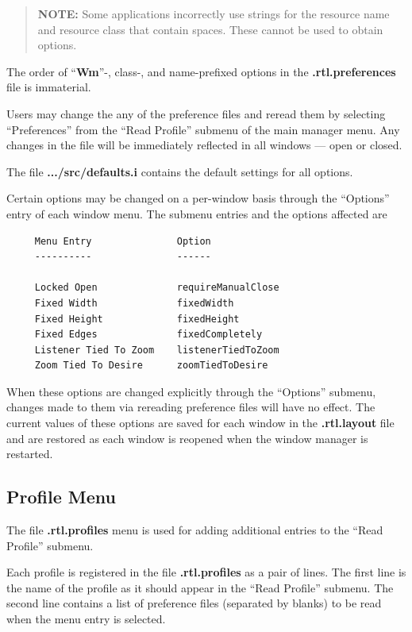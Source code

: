 \begin{quotation}
{\bf NOTE:} Some applications incorrectly use strings for the resource name
and resource class that contain spaces.  These cannot be used to
obtain options.
\end{quotation}

The order of ``{\bf Wm}''-, class-, and name-prefixed options in the
{\bf .rtl.preferences} file is immaterial.

Users may change the any of the preference files and reread them by
selecting ``Preferences'' from the ``Read Profile'' submenu of the main
manager menu.
Any changes in the file will be immediately reflected
in all windows --- open or closed.

The file {\bf .../src/defaults.i} contains the default settings for all
options.

Certain options may be changed on a per-window basis through the
``Options'' entry of each window menu.  The submenu entries and the options
affected are

\begin{verbatim}
     Menu Entry               Option
     ----------               ------

     Locked Open              requireManualClose
     Fixed Width              fixedWidth
     Fixed Height             fixedHeight
     Fixed Edges              fixedCompletely
     Listener Tied To Zoom    listenerTiedToZoom
     Zoom Tied To Desire      zoomTiedToDesire
\end{verbatim}

When these options are changed explicitly through the ``Options'' submenu,
changes made to them via rereading preference files will
have no effect.  The current values of these options are saved for each
window in the {\bf .rtl.layout} file and are restored as each window is
reopened when the window manager is restarted.

\subsection{Profile Menu}

The file {\bf .rtl.profiles} menu is used for adding additional entries
to the ``Read Profile'' submenu.

Each profile is registered in the file {\bf .rtl.profiles} as a pair of
lines.
The first line is the name of the profile as it should appear in the
``Read Profile'' submenu.
The second line contains a list of preference files (separated by
blanks) to be read when the menu entry is selected.


